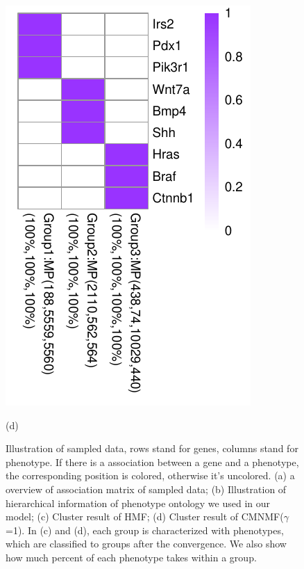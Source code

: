 \documentclass{bmcart}
\begin{document}
\begin{figure}[!h]
\begin{minipage}{.38\linewidth}
   \includegraphics[width=\linewidth]{DrawPictures/v4.pdf}
    \centerline{(d)}
  \end{minipage}
  \caption{Illustration of sampled data, rows stand for genes, columns stand for phenotype. If there is a association between a gene and a phenotype, the corresponding position is colored, otherwise it's uncolored. (a) a overview of association matrix of sampled data; (b) Illustration of hierarchical information of phenotype ontology we used in our model; (c) Cluster result of HMF; (d) Cluster result of CMNMF($\gamma$=1). In (c) and (d), each group is characterized with phenotypes, which are classified to groups after the convergence. We also show how much percent of each phenotype takes within a group.}
  \label{fig:sampled_result}
\end{figure}
\end{document}
